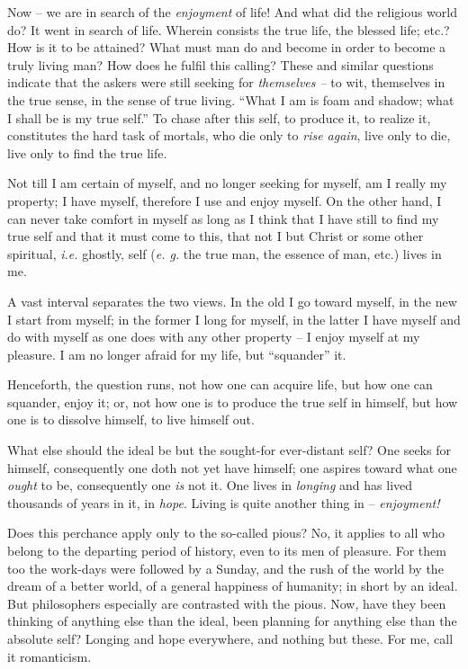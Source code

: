 \documentclass[12pt,a4paper]{book}
\begin{document}
Now -- we are in search of the \textit{enjoyment} of life! And what did the 
religious world do? It went in search of life. Wherein consists the true life, 
the blessed life; etc.? How is it to be attained? What must man do and become 
in order to become a truly living man? How does he fulfil this calling? These 
and similar questions indicate that the askers were still seeking for 
\textit{themselves --} to wit, themselves in the true sense, in the sense of 
true living. ``What I am is foam and shadow; what I shall be is my true 
self.'' To chase after this self, to produce it, to realize it, constitutes 
the hard task of mortals, who die only to \textit{rise again}, live only to 
die, live only to find the true life.

Not till I am certain of myself, and no longer seeking for myself, am I really 
my property; I have myself, therefore I use and enjoy myself. On the other 
hand, I can never take comfort in myself as long as I think that I have still 
to find my true self and that it must come to this, that not I but Christ or 
some other spiritual, \textit{i.e.} ghostly, self (\textit{e. g.} the true 
man, the essence of man, etc.) lives in me.

A vast interval separates the two views. In the old I go toward myself, in the 
new I start from myself; in the former I long for myself, in the latter I have 
myself and do with myself as one does with any other property -- I enjoy 
myself at my pleasure. I am no longer afraid for my life, but ``squander'' 
it.

Henceforth, the question runs, not how one can acquire life, but how one can 
squander, enjoy it; or, not how one is to produce the true self in himself, 
but how one is to dissolve himself, to live himself out.

What else should the ideal be but the sought-for ever-distant self? One seeks 
for himself, consequently one doth not yet have himself; one aspires toward 
what one \textit{ought} to be, consequently one \textit{is} not it. One lives 
in \textit{longing} and has lived thousands of years in it, in \textit{hope}. 
Living is quite another thing in -- \textit{enjoyment!}

Does this perchance apply only to the so-called pious? No, it applies to all 
who belong to the departing period of history, even to its men of pleasure. 
For them too the work-days were followed by a Sunday, and the rush of the 
world by the dream of a better world, of a general happiness of humanity; in 
short by an ideal. But philosophers especially are contrasted with the pious. 
Now, have they been thinking of anything else than the ideal, been planning 
for anything else than the absolute self? Longing and hope everywhere, and 
nothing but these. For me, call it romanticism.
\end{document}
